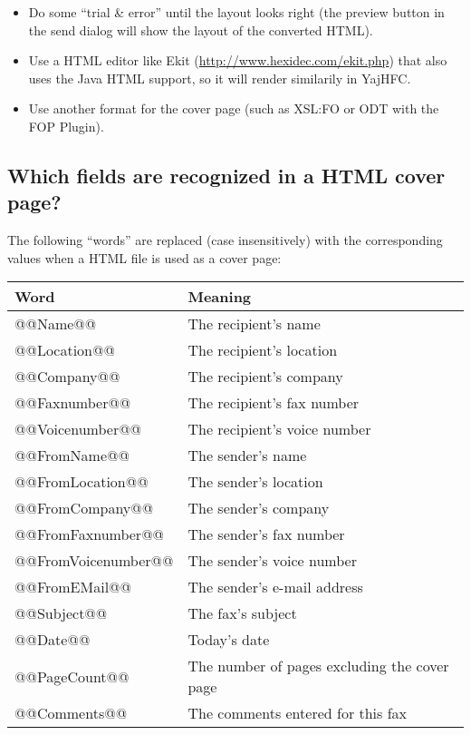 \documentclass[a4paper,10pt]{scrartcl}
\begin{document}
\begin{itemize}
 \item Do some ``trial \& error'' until the layout looks right (the preview button in the send dialog will show the layout of the converted HTML).
 \item Use a HTML editor like Ekit (\url{http://www.hexidec.com/ekit.php}) that also uses the Java HTML support, so it will render similarily in YajHFC.
 \item Use another format for the cover page (such as XSL:FO or ODT with the FOP Plugin).
\end{itemize}

\subsection{Which fields are recognized in a HTML cover page?}

The following ``words'' are replaced (case insensitively) with the corresponding values when a HTML file is used as a cover page:

\begin{center}
\begin{tabular}{|l|l|}
\hline
\bfseries Word & \bfseries Meaning \\
\hline\hline
\ttfamily @@Name@@ & The recipient's name \\\hline
\ttfamily @@Location@@ & The recipient's location \\\hline
\ttfamily @@Company@@ & The recipient's company \\\hline
\ttfamily @@Faxnumber@@ & The recipient's fax number \\\hline
\ttfamily @@Voicenumber@@ & The recipient's voice number \\\hline
\ttfamily @@FromName@@ & The sender's name \\\hline
\ttfamily @@FromLocation@@ & The sender's location \\\hline
\ttfamily @@FromCompany@@ & The sender's company \\\hline
\ttfamily @@FromFaxnumber@@ & The sender's fax number \\\hline
\ttfamily @@FromVoicenumber@@ & The sender's voice number \\\hline
\ttfamily @@FromEMail@@ & The sender's e-mail address \\\hline
\ttfamily @@Subject@@ & The fax's subject \\\hline
\ttfamily @@Date@@ & Today's date \\\hline
\ttfamily @@PageCount@@ & The number of pages excluding the cover page \\\hline
\ttfamily @@Comments@@ & The comments entered for this fax \\\hline
\end{tabular}
\end{center}
\end{document}
